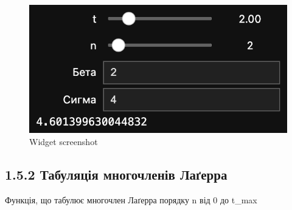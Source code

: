 \documentclass[11pt]{article}
\begin{document}
    \begin{figure}
\centering
\includegraphics{screenshots/1.png}
\caption{Widget screenshot}
\end{figure}
\newpage


    \subsection*{1.5.2 Табуляція многочленів
Лаґерра}\label{ux442ux430ux431ux443ux43bux44fux446ux456ux44f-ux43cux43dux43eux433ux43eux447ux43bux435ux43dux456ux432-ux43bux430ux491ux435ux440ux440ux430}

Функція, що табулює многочлен Лаґерра порядку n від 0 до t\_max
\end{document}
